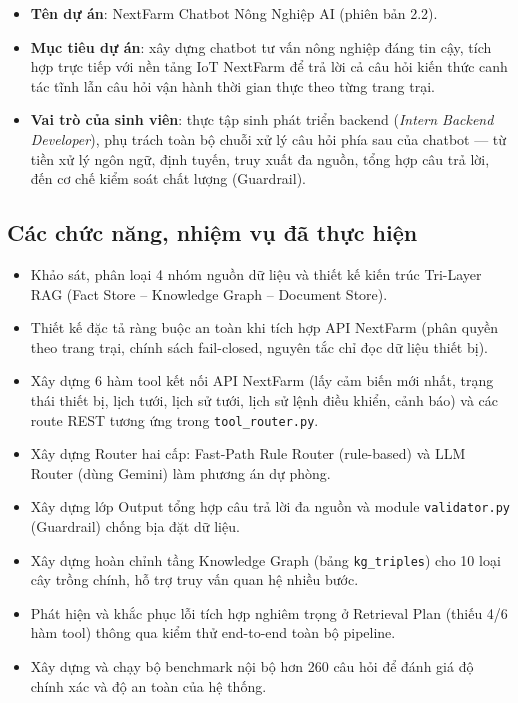 \begin{itemize}
    \item \textbf{Tên dự án}: NextFarm Chatbot Nông Nghiệp AI (phiên bản 2.2).
    \item \textbf{Mục tiêu dự án}: xây dựng chatbot tư vấn nông nghiệp đáng tin cậy,
    tích hợp trực tiếp với nền tảng IoT NextFarm để trả lời cả câu hỏi kiến thức canh
    tác tĩnh lẫn câu hỏi vận hành thời gian thực theo từng trang trại.
    \item \textbf{Vai trò của sinh viên}: thực tập sinh phát triển backend
    (\textit{Intern Backend Developer}), phụ trách toàn bộ chuỗi xử lý câu hỏi phía sau
    của chatbot — từ tiền xử lý ngôn ngữ, định tuyến, truy xuất đa nguồn, tổng hợp câu
    trả lời, đến cơ chế kiểm soát chất lượng (Guardrail).
\end{itemize}

\subsection{Các chức năng, nhiệm vụ đã thực hiện}

\begin{itemize}
    \item Khảo sát, phân loại 4 nhóm nguồn dữ liệu và thiết kế kiến trúc Tri-Layer RAG
    (Fact Store -- Knowledge Graph -- Document Store).
    \item Thiết kế đặc tả ràng buộc an toàn khi tích hợp API NextFarm (phân quyền theo
    trang trại, chính sách fail-closed, nguyên tắc chỉ đọc dữ liệu thiết bị).
    \item Xây dựng 6 hàm tool kết nối API NextFarm (lấy cảm biến mới nhất, trạng thái
    thiết bị, lịch tưới, lịch sử tưới, lịch sử lệnh điều khiển, cảnh báo) và các route
    REST tương ứng trong \texttt{tool\_router.py}.
    \item Xây dựng Router hai cấp: Fast-Path Rule Router (rule-based) và LLM Router
    (dùng Gemini) làm phương án dự phòng.
    \item Xây dựng lớp Output tổng hợp câu trả lời đa nguồn và module \texttt{validator.py}
    (Guardrail) chống bịa đặt dữ liệu.
    \item Xây dựng hoàn chỉnh tầng Knowledge Graph (bảng \texttt{kg\_triples}) cho 10
    loại cây trồng chính, hỗ trợ truy vấn quan hệ nhiều bước.
    \item Phát hiện và khắc phục lỗi tích hợp nghiêm trọng ở Retrieval Plan (thiếu 4/6
    hàm tool) thông qua kiểm thử end-to-end toàn bộ pipeline.
    \item Xây dựng và chạy bộ benchmark nội bộ hơn 260 câu hỏi để đánh giá độ chính xác
    và độ an toàn của hệ thống.
\end{itemize}


